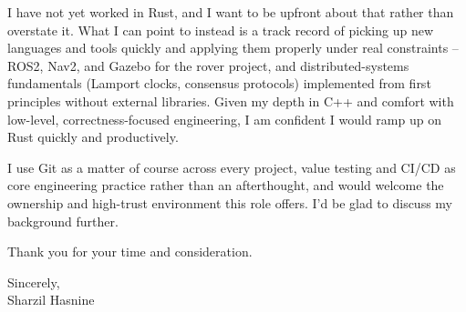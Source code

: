 \documentclass[letterpaper,11pt]{article}
\begin{document}
I have not yet worked in Rust, and I want to be upfront about that rather than overstate it. What I can point to instead is a track record of picking up new languages and tools quickly and applying them properly under real constraints -- ROS2, Nav2, and Gazebo for the rover project, and distributed-systems fundamentals (Lamport clocks, consensus protocols) implemented from first principles without external libraries. Given my depth in C++ and comfort with low-level, correctness-focused engineering, I am confident I would ramp up on Rust quickly and productively.

I use Git as a matter of course across every project, value testing and CI/CD as core engineering practice rather than an afterthought, and would welcome the ownership and high-trust environment this role offers. I'd be glad to discuss my background further.

Thank you for your time and consideration.

\vspace{10pt}

Sincerely, \\
Sharzil Hasnine
\end{document}
